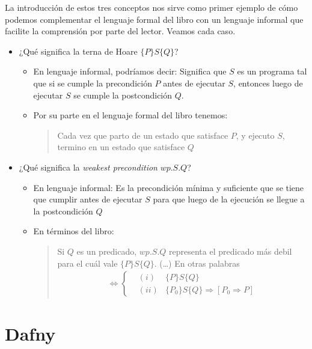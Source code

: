\documentclass[11pt, a4paper, openany]{book}
\begin{document}
    La introducción de estos tres conceptos nos sirve como primer ejemplo de cómo podemos complementar el lenguaje formal del libro con un lenguaje informal que facilite la comprensión por parte del lector. Veamos cada caso.
    \begin{itemize}
        \item ¿Qué significa la terna de Hoare
        \begin{math}
            \{P\}S\{Q\}
        \end{math}?
        \begin{itemize}
            \item En lenguaje informal, podríamos decir: Significa que $S$ es un programa tal que si se cumple la precondición $P$ antes de ejecutar $S$, entonces luego de ejecutar $S$ se cumple la postcondición $Q$.
            \item Por su parte en el lenguaje formal del libro tenemos:
            \begin{quote}
                Cada vez que parto de un estado que satisface $P$, y ejecuto $S$, termino en un estado que satisface $Q$
            \end{quote}
        \end{itemize}
        \item ¿Qué significa la \textit{weakest precondition}
        \begin{math}
            wp.S.Q
        \end{math}?
        \begin{itemize}
            \item En lenguaje informal: Es la precondición mínima y suficiente que se tiene que cumplir antes de ejecutar $S$ para que luego de la ejecución se llegue a la postcondición $Q$
            \item En términos del libro:
            \begin{quote}
                Si $Q$ es un predicado, $wp.S.Q$ representa el predicado más debil para el cuál vale $\{P\}S\{Q\}$. (\dots) En otras palabras
                \begin{align*}
                    [wp.S.Q = P] \Longleftrightarrow \left\{
                        \begin{matrix}
                         &(i) & \{P\}S\{Q\} \\ 
                         &(ii) & \{P_{0}\}S\{Q\} \Rightarrow [P_{0} \Rightarrow P]
                        \end{matrix}\right.
                \end{align*}
            \end{quote}
        \end{itemize}
    \end{itemize}
    \chapter{Dafny}
\end{document}
